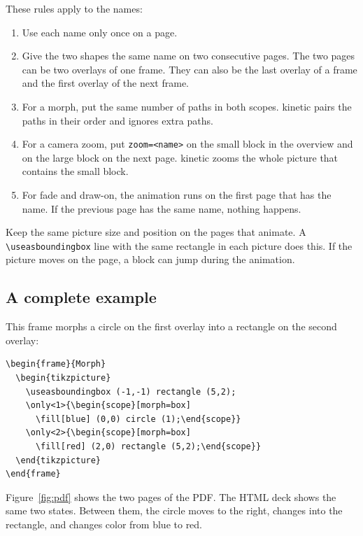 \documentclass[11pt]{article}
\newcommand{\pkg}{\textsf{kinetic}}
\newcommand{\cmd}[1]{\texttt{#1}}
\begin{document}
These rules apply to the names:
\begin{enumerate}
	\item Use each name only once on a page.
	\item Give the two shapes the same name on two consecutive pages. The two pages
	      can be two overlays of one frame. They can also be the last overlay of a frame
	      and the first overlay of the next frame.
	\item For a morph, put the same number of paths in both scopes. \pkg{} pairs the
	      paths in their order and ignores extra paths.
	\item For a camera zoom, put \cmd{zoom=<name>} on the small block in the
	      overview and on the large block on the next page. \pkg{} zooms the whole
	      picture that contains the small block.
	\item For fade and draw-on, the animation runs on the first page that has the
	      name. If the previous page has the same name, nothing happens.
\end{enumerate}

Keep the same picture size and position on the pages that animate. A
\cmd{\textbackslash useasboundingbox} line with the same rectangle in each picture
does this. If the picture moves on the page, a block can jump during the
animation.

\subsection{A complete example}

This frame morphs a circle on the first overlay into a rectangle on the second
overlay:
\begin{lstlisting}
\begin{frame}{Morph}
  \begin{tikzpicture}
    \useasboundingbox (-1,-1) rectangle (5,2);
    \only<1>{\begin{scope}[morph=box]
      \fill[blue] (0,0) circle (1);\end{scope}}
    \only<2>{\begin{scope}[morph=box]
      \fill[red] (2,0) rectangle (5,2);\end{scope}}
  \end{tikzpicture}
\end{frame}
\end{lstlisting}
Figure~\ref{fig:pdf} shows the two pages of the PDF. The HTML deck shows the same
two states. Between them, the circle moves to the right, changes into the
rectangle, and changes color from blue to red.
\end{document}

